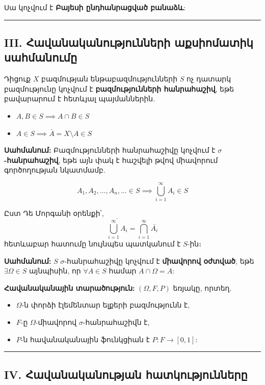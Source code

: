 \documentclass[12pt, a4paper]{article}
\begin{document}
Սա կոչվում է \textbf{Բայեսի ընդհանրացված բանաձև}:

\vspace{1em}
\hrule
\vspace{1em}

\subsection{\textbf{III. Հավանականությունների աքսիոմատիկ սահմանումը}}

Դիցուք $X$ բազմության ենթաբազմությունների $S$ ոչ դատարկ բազմությունը կոչվում է \textbf{բազմությունների հանրահաշիվ}, եթե բավարարում է հետևյալ պայմաններին.

\begin{itemize}
    \item $A, B \in S \implies A \cap B \in S$
    \item $A \in S \implies \bar{A} = X \setminus A \in S$
\end{itemize}

\textbf{Սահմանում:} Բազմությունների հանրահաշիվը կոչվում է \textbf{$\sigma$-հանրահաշիվ}, եթե այն փակ է հաշվելի թվով միավորում գործողության նկատմամբ.

$$A_1, A_2, \dots, A_n, \dots \in S \implies \bigcup_{i=1}^{\infty} A_i \in S$$

Ըստ Դե Մորգանի օրենքի՝,
$$\overline{\bigcup_{i=1}^{\infty} A_i} = \bigcap_{i=1}^{\infty} \bar{A_i}$$հետևաբար հատումը նույնպես պատկանում է $S$-ին։

\textbf{Սահմանում:} $S$ $\sigma$-հանրահաշիվը կոչվում է \textbf{միավորով օժտված}, եթե $\exists \Omega \in S$ այնպիսին, որ $\forall A \in S$ համար $A \cap \Omega = A$:

\textbf{Հավանականային տարածություն:} $(\Omega, F, P)$ եռյակը, որտեղ.

\begin{itemize}
    \item $\Omega$-ն փորձի էլեմենտար ելքերի բազմությունն է,
    \item $F$-ը $\Omega$-միավորով $\sigma$-հանրահաշիվն է,
    \item $P$-ն հավանականային ֆունկցիան է $P: F \to [0, 1]$:
\end{itemize}

\vspace{1em}
\hrule
\vspace{1em}

\subsection{\textbf{IV. Հավանականության հատկությունները}}
\end{document}
